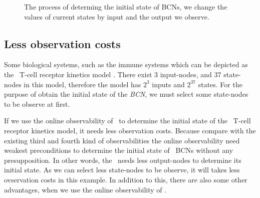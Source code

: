 \begin{figure}[thpb]
      \centering
      
      \caption{The process of determing the initial state of BCNs, we change the values of current states by input and the output we observe. }
      \label{fig:5}
   \end{figure}
\subsection{Less observation costs}
Some biological systems, such as the immune systems which can be depicted as the \BCN\ T-cell receptor kinetics model \cite{Klamt2006A}. There exist $3$ input-nodes, and $37$ state-nodes in this model, therefore the model has $2^3$ inputs and $2^{37}$ states. For the purpose of obtain the initial state of the {\em BCN}, we must select some state-nodes to be observe at first. 

If we use the online observability of \BCNs\ to determine the initial state of the \BCN\ T-cell receptor kinetics model, it needs less observation costs. Because compare with the existing third and fourth kind of observabilities the online observability need weakest preconditions to determine the initial state of {\ BCNs} without any presupposition. In other words, the \BCNs\ needs less output-nodes to determine its initial state. As we can select less state-nodes to be observe, it will takes less ovservation costs in this example. In addition to this, there are also some other advantages, when we use the online observability of \BCNs.

